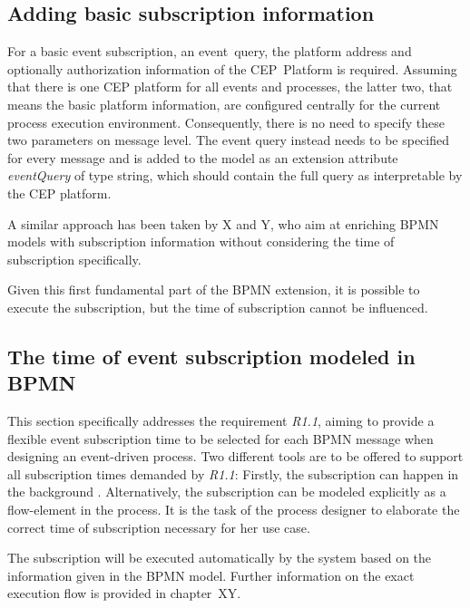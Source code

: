\subsection{Adding basic subscription information}\label{ch:bpmnx:basic}

For a basic event subscription, an event~query, the platform address and optionally authorization information of the CEP~Platform is required. 
Assuming that there is one CEP platform for all events and processes, the latter two, that means the basic platform information, are configured centrally for the current process execution environment. Consequently, there is no need to specify these two parameters on message level. 
The event query instead needs to be specified for every message and is added to the model as an extension attribute \textit{eventQuery} of type string, which should contain the full query as interpretable by the CEP platform.


A similar approach has been taken by X and Y, who aim at enriching BPMN models with subscription information without considering the time of subscription specifically.

Given this first fundamental part of the BPMN extension, it is possible to execute the subscription, but the time of subscription cannot be influenced.

\subsection{The time of event subscription modeled in BPMN}\label{ch:bpmnx:subscriptiontimes}

This section specifically addresses the requirement \textit{R1.1}, aiming to provide a flexible event subscription time to be selected for each BPMN message when designing an event-driven process.
Two different tools are to be offered to support all subscription times demanded by \textit{R1.1}: Firstly, the subscription can happen in the background . Alternatively, the subscription can be modeled explicitly as a flow-element in the process.
It is the task of the process designer to elaborate the correct time of subscription necessary for her use case.

The subscription will be executed automatically by the system based on the information given in the BPMN model. Further information on the exact execution flow is provided in chapter~XY. 

